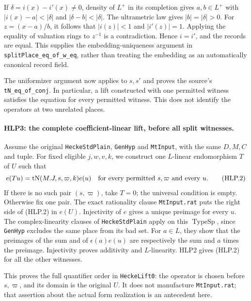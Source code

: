 If \(\delta=i(x)-i'(x)\ne0\), density of \(L^+\) in its completion
gives \(a,b\in L^+\) with
\(|i(x)-a|<|\delta|\) and \(|\delta-b|<|\delta|\).
The ultrametric law gives \(|b|=|\delta|>0\). For
\(z=(x-a)/b\), it follows that \(|i(z)|<1\) and
\(|i'(z)|=1\). Applying the equality of valuation rings to
\(z^{-1}\) is a contradiction. Hence \(i=i'\), and the records
are equal. This supplies the embedding-uniqueness argument in
\texttt{split\allowbreak Place\_\allowbreak eq\_\allowbreak of\_\allowbreak w\_\allowbreak eq}, rather than treating the
embedding as an automatically canonical record field.

The uniformizer argument now applies to \(s,s'\) and proves the
source's \texttt{t\allowbreak N\_\allowbreak eq\_\allowbreak of\_\allowbreak conj}. In particular, a lift constructed
with one permitted witness satisfies the equation for every
permitted witness. This does not identify the operators at two
unrelated places.

\paragraph{HLP3: the complete coefficient-linear lift, before all split witnesses.}
\label{claim:HLP3}
Assume the original \texttt{Hecke\allowbreak Std\allowbreak Plain}, \texttt{Gen\allowbreak Hyp} and
\texttt{Mt\allowbreak Input}, with the same \(D,M,C\) and tuple. For fixed eligible
\(j,w,v,k\), we construct one \(L\)-linear endomorphism \(T\) of \(U\)
such that
\[
 e(Tu)=\operatorname{tN}(M.J,s,\varpi,k)e(u)
   \quad\hbox{for every permitted }s,\varpi\hbox{ and every }u. \tag{HLP.2}
\]
If there is no such pair \((s,\varpi)\), take \(T=0\); the universal
condition is empty. Otherwise fix one pair. The exact rationality
clause \texttt{Mt\allowbreak Input.rat} puts the right side of (HLP.2) in
\(e(U)\). Injectivity of \(e\) gives a unique preimage for every \(u\).
The complex-linearity clauses of \texttt{Hecke\allowbreak Std\allowbreak Plain} apply on this
\(\operatorname{TypeSp}\), since \texttt{Gen\allowbreak Hyp} excludes the same
place from its bad set. For \(a\in L\), they show that the preimages
of the sum and of \(\epsilon(a)e(u)\) are respectively the sum and
\(a\) times the preimage. Injectivity proves additivity and
\(L\)-linearity. HLP2 gives (HLP.2) for all the other witnesses.

This proves the full quantifier order in \texttt{Hecke\allowbreak Lift0}: the
operator is chosen before \(s,\varpi\), and its domain is the original
\(U\). It does not manufacture \texttt{Mt\allowbreak Input.rat}; that assertion
about the actual form realization is an antecedent here.

